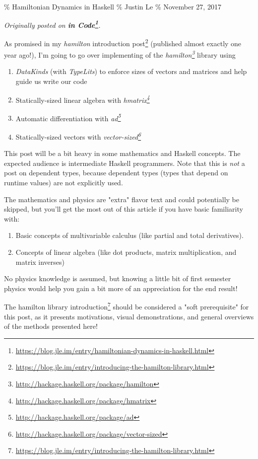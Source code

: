 \documentclass[]{article}
\renewcommand{\href}[2]{#2\footnote{\url{#1}}}
\begin{document}
\% Hamiltonian Dynamics in Haskell \% Justin Le \% November 27, 2017

\emph{Originally posted on
\textbf{\href{https://blog.jle.im/entry/hamiltonian-dynamics-in-haskell.html}{in
Code}}.}

As promised in my
\href{https://blog.jle.im/entry/introducing-the-hamilton-library.html}{\emph{hamilton}
introduction post} (published almost exactly one year ago!), I'm going to go
over implementing of the
\emph{\href{http://hackage.haskell.org/package/hamilton}{hamilton}} library
using

\begin{enumerate}
\tightlist
\item
  \emph{DataKinds} (with \emph{TypeLits}) to enforce sizes of vectors and
  matrices and help guide us write our code
\item
  Statically-sized linear algebra with
  \emph{\href{http://hackage.haskell.org/package/hmatrix}{hmatrix}}
\item
  Automatic differentiation with
  \emph{\href{http://hackage.haskell.org/package/ad}{ad}}
\item
  Statically-sized vectors with
  \emph{\href{http://hackage.haskell.org/package/vector-sized}{vector-sized}}
\end{enumerate}

This post will be a bit heavy in some mathematics and Haskell concepts. The
expected audience is intermediate Haskell programmers. Note that this is
\emph{not} a post on dependent types, because dependent types (types that depend
on runtime values) are not explicitly used.

The mathematics and physics are "extra" flavor text and could potentially be
skipped, but you'll get the most out of this article if you have basic
familiarity with:

\begin{enumerate}
\tightlist
\item
  Basic concepts of multivariable calculus (like partial and total derivatives).
\item
  Concepts of linear algebra (like dot products, matrix multiplication, and
  matrix inverses)
\end{enumerate}

No physics knowledge is assumed, but knowing a little bit of first semester
physics would help you gain a bit more of an appreciation for the end result!

The
\href{https://blog.jle.im/entry/introducing-the-hamilton-library.html}{hamilton
library introduction} should be considered a "soft prerequisite" for this post,
as it presents motivations, visual demonstrations, and general overviews of the
methods presented here!
\end{document}
